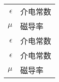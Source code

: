 
\begin{nomenclature*}
\label{chap:symb}

\begin{longtable}{rl}
  $\epsilon$  & 介电常数  \\  
  $\mu$       & 磁导率    \\
  $\epsilon$  & 介电常数  \\

  $\epsilon$  & 介电常数  \\
  $\mu$       & 磁导率    \\
\end{longtable}

\end{nomenclature*}

